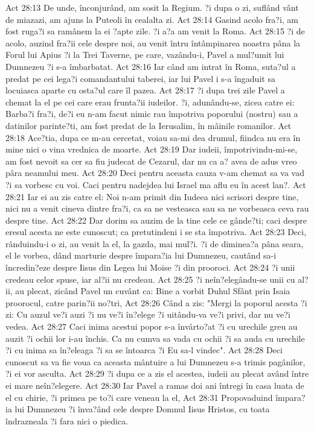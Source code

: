 Act 28:13  De unde, înconjurând, am sosit la Regium. ?i dupa o zi, suflând vânt de miazazi, am ajuns la Puteoli în cealalta zi.
Act 28:14  Gasind acolo fra?i, am fost ruga?i sa ramânem la ei ?apte zile. ?i a?a am venit la Roma.
Act 28:15  ?i de acolo, auzind fra?ii cele despre noi, au venit întru întâmpinarea noastra pâna la Forul lui Apius ?i la Trei Taverne, pe care, vazându-i, Pavel a mul?umit lui Dumnezeu ?i s-a îmbarbatat.
Act 28:16  Iar când am intrat în Roma, suta?ul a predat pe cei lega?i comandantului taberei, iar lui Pavel i s-a îngaduit sa locuiasca aparte cu osta?ul care îl pazea.
Act 28:17  ?i dupa trei zile Pavel a chemat la el pe cei care erau frunta?ii iudeilor. ?i, adunându-se, zicea catre ei: Barba?i fra?i, de?i eu n-am facut nimic rau împotriva poporului (nostru) sau a datinilor parinte?ti, am fost predat de la Ierusalim, în mâinile romanilor.
Act 28:18  Ace?tia, dupa ce m-au cercetat, voiau sa-mi dea drumul, fiindca nu era în mine nici o vina vrednica de moarte.
Act 28:19  Dar iudeii, împotrivindu-mi-se, am fost nevoit sa cer sa fiu judecat de Cezarul, dar nu ca a? avea de adus vreo pâra neamului meu.
Act 28:20  Deci pentru aceasta cauza v-am chemat sa va vad ?i sa vorbesc cu voi. Caci pentru nadejdea lui Israel ma aflu eu în acest lan?.
Act 28:21  Iar ei au zis catre el: Noi n-am primit din Iudeea nici scrisori despre tine, nici nu a venit cineva dintre fra?i, ca sa ne vesteasca sau sa ne vorbeasca ceva rau despre tine.
Act 28:22  Dar dorim sa auzim de la tine cele ce gânde?ti; caci despre eresul acesta ne este cunoscut; ca pretutindeni i se sta împotriva.
Act 28:23  Deci, rânduindu-i o zi, au venit la el, la gazda, mai mul?i. ?i de diminea?a pâna seara, el le vorbea, dând marturie despre împara?ia lui Dumnezeu, cautând sa-i încredin?eze despre Iisus din Legea lui Moise ?i din prooroci.
Act 28:24  ?i unii credeau celor spuse, iar al?ii nu credeau.
Act 28:25  ?i neîn?elegându-se unii cu al?ii, au plecat, zicând Pavel un cuvânt ca: Bine a vorbit Duhul Sfânt prin Isaia proorocul, catre parin?ii no?tri,
Act 28:26  Când a zis: "Mergi la poporul acesta ?i zi: Cu auzul ve?i auzi ?i nu ve?i în?elege ?i uitându-va ve?i privi, dar nu ve?i vedea.
Act 28:27  Caci inima acestui popor s-a învârto?at ?i cu urechile greu au auzit ?i ochii lor i-au închis. Ca nu cumva sa vada cu ochii ?i sa auda cu urechile ?i cu inima sa în?eleaga ?i sa se întoarca ?i Eu sa-l vindec".
Act 28:28  Deci cunoscut sa va fie voua ca aceasta mântuire a lui Dumnezeu s-a trimis pagânilor, ?i ei vor asculta.
Act 28:29  ?i dupa ce a zis el acestea, iudeii au plecat având între ei mare neîn?elegere.
Act 28:30  Iar Pavel a ramas doi ani întregi în casa luata de el cu chirie, ?i primea pe to?i care veneau la el,
Act 28:31  Propovaduind împara?ia lui Dumnezeu ?i înva?ând cele despre Domnul Iisus Hristos, cu toata îndrazneala ?i fara nici o piedica.


